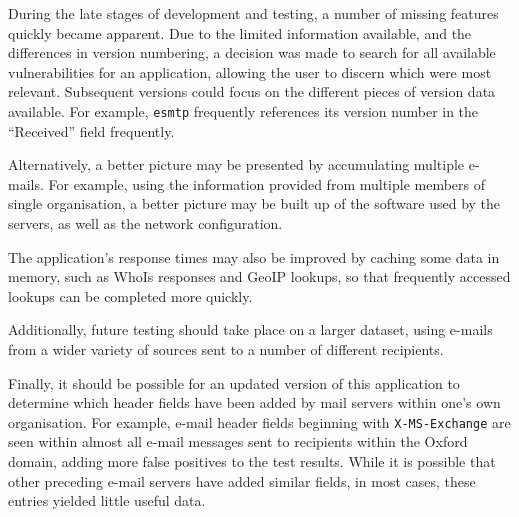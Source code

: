 During the late stages of development and testing, a number of missing features
quickly became apparent. Due to the limited information available, and the
differences in version numbering, a decision was made to search for all
available vulnerabilities for an application, allowing the user to discern
which were most relevant.  Subsequent versions could focus on the different
pieces of version data available.  For example, \texttt{esmtp} frequently
references its version number in the ``Received'' field frequently.

Alternatively, a better picture may be presented by accumulating multiple
e-mails. For example, using the information provided from multiple members of
single organisation, a better picture may be built up of the software used by
the servers, as well as the network configuration.

The application's response times may also be improved by caching some data in
memory, such as WhoIs responses and GeoIP lookups, so that frequently accessed
lookups can be completed more quickly.

Additionally, future testing should take place on a larger dataset, using
e-mails from a wider variety of sources sent to a number of different
recipients.  

Finally, it should be possible for an updated version of this application to
determine which header fields have been added by mail servers within one's own
organisation.  For example, e-mail header fields beginning with
\texttt{X-MS-Exchange} are seen within almost all e-mail messages sent to
recipients within the Oxford domain, adding more false positives to the test
results. While it is possible that other preceding e-mail servers have added
similar fields, in most cases, these entries yielded little useful data.

